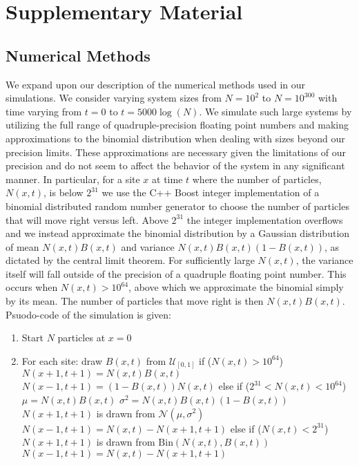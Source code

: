 \section{Supplementary Material}
\label{ch2_supp}

\subsection{Numerical Methods}
\label{sec:Numerical}
We expand upon our description of the numerical methods used in our simulations. We consider varying system sizes from  $N=10^2$ to $N=10^{300}$ with time varying from $t=0$ to $t= 5000 \log(N)$. We simulate such large systems by utilizing the full range of quadruple-precision floating point numbers and making approximations to the binomial distribution when dealing with sizes beyond our precision limits. These approximations are necessary given the limitations of our precision and do not seem to affect the behavior of the system in any significant manner. In particular, for a site $x$ at time $t$ where the number of particles, $N(x,t)$, is below $2^{31}$ we use the C++ Boost integer implementation of a binomial distributed random number generator to choose the number of particles that will move right versus left. Above $2^{31}$ the integer implementation overflows and we instead  approximate the binomial distribution by a Gaussian distribution of mean $N(x,t) B(x,t)$ and variance $N(x,t)  B(x,t) (1 - B(x,t))$, as dictated by the central limit theorem. For sufficiently large $N(x,t)$, the variance itself will fall outside of the precision of a quadruple floating point number. This occurs when $N(x,t) > 10^{64}$, above which we approximate the binomial simply by its mean. The number of particles that move right is then $N(x,t) B(x,t)$. Psuodo-code of the simulation is given:

\begin{enumerate} 

 \item Start $N$ particles at $x=0$
 \item For each site:
  \subitem draw $B(x,t)$ from $\mathcal{U}_{[0, 1]}$
  \subitem if ($N(x, t) > 10^{64}$)
   \subsubitem $N(x+1, t+1) = N(x, t)B(x,t)$
   \subsubitem $N(x-1, t+1) = (1-B(x,t))N(x,t)$
  \subitem else if ($2^{31} < N(x, t) < 10^{64}$)
   \subsubitem $\mu = N(x,t)B(x,t)$
   \subsubitem $\sigma^2 = N(x,t)B(x,t)(1-B(x,t))$
   \subsubitem $N(x+1, t+1)$ is drawn from $\mathcal{N}(\mu, \sigma^2)$
   \subsubitem $N(x-1, t+1) = N(x, t) - N(x+1, t+1)$
  \subitem else if ($N(x, t) < 2^{31}$)
   \subsubitem $N(x+1, t+1)$ is drawn from $\mathrm{Bin}(N(x,t), B(x,t))$
   \subsubitem $N(x-1, t+1) = N(x,t) - N(x+1, t+1)$
\end{enumerate}

